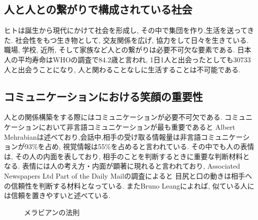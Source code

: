 \subsection{人と人との繋がりで構成されている社会}
ヒトは誕生から現代にかけて社会を形成し, その中で集団を作り,生活を送ってきた.
社会性をもつ生き物として, 交友関係を広げ, 協力をして日々を生きている.
職場, 学校, 近所, そして家族など人との繋がりは必要不可欠な要素である.
日本人の平均寿命はWHOの調査で84.2歳\cite{WHO_reserch}と言われ,
1日1人と出会ったとしても30733人と出会うことになり, 人と関わることなしに生活することは不可能である.


\subsection{コミュニケーションにおける笑顔の重要性}
人との関係構築をする際にはコミュニケーションが必要不可欠である.
コミュニケーションにおいて非言語コミュニケーションが最も重要であると
Albert Mehrabianは述べており,会話中,相手の受け取る情報量は非言語コミュニケーションが93\%を占め,
視覚情報は55\%を占めると言われている\cite{rule_of_Mehrabian}.
その中でも人の表情は, その人の内面を表しており, 相手のことを判断するときに重要な判断材料となる.
表情には人の考え方・内面が顕著に現れると言われており,
Associated Newspapers Ltd Part of the Daily Mailの調査によると
目尻と口の動きは相手への信頼性を判断する材料となっている\cite{TheMailonSunday}.
またBruno Leangによれば, 似ている人には信頼を置きやすいと述べている\cite{Bruno}.

\begin{figure}[htbp]
    \begin{center}
    \end{center}
    \caption{メラビアンの法則}
    \label{fig:mehrabian}
\end{figure}

